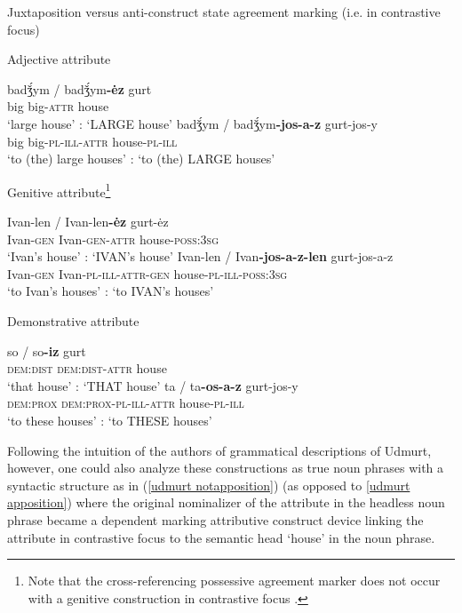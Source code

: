 \begin{exe}
\ex \rm{Juxtaposition versus anti-construct state agreement marking (i.e. in contrastive focus) \citep{kelmakov-etal1999,winkler2001}}
\begin{xlist}
\ex	\rm{Adjective attribute}
\begin{xlist}
\ex 	
\gll	badǯ́ym / badǯ́ym\textbf{-ėz} gurt\\
	big {} big-\textsc{attr} house\\
\glt	‘large house’ : ‘LARGE house’
\ex	
\gll	badǯ́ym / badǯ́ym\textbf{-jos-a-z} gurt-jos-y\\
	big {} big-\textsc{pl}-\textsc{ill}-\textsc{attr} house-\textsc{pl}-\textsc{ill}\\
\glt	‘to (the) large houses’ : ‘to (the) LARGE houses’
\end{xlist}
\ex	\rm{Genitive attribute}\footnote{Note that the cross-referencing possessive agreement marker does not occur with a genitive construction in contrastive focus \citep[81]{kelmakov-etal1999}.}
\begin{xlist}
\ex	
\gll	Ivan-len / Ivan-len\textbf{-ėz} gurt-ėz\\
	Ivan-\textsc{gen} {} Ivan-\textsc{gen}-\textsc{attr} house-\textsc{poss:3sg}\\
\glt	‘Ivan's house’ : ‘IVAN's house’
\ex	
\gll	Ivan-len / Ivan\textbf{-jos-a-z-len} gurt-jos-a-z\\
	Ivan-\textsc{gen} {} Ivan-\textsc{pl}-\textsc{ill}-\textsc{attr}-\textsc{gen} house-\textsc{pl}-\textsc{ill}-\textsc{poss:3sg}\\
\glt	‘to Ivan's houses’ : ‘to IVAN's houses’
\end{xlist}
\ex	\rm{Demonstrative attribute} \label{udmurt det dem}
\begin{xlist}
\ex	
\gll	so / so\textbf{-iz} gurt\\
 	\textsc{dem:dist} {} \textsc{dem:dist}-\textsc{attr} house\\
\glt	‘that house’ : ‘THAT house’
\ex 	
\gll	ta / ta\textbf{-os-a-z} gurt-jos-y\\
	\textsc{dem:prox} {} \textsc{dem:prox}-\textsc{pl}-\textsc{ill}-\textsc{attr} house-\textsc{pl}-\textsc{ill}\\
\glt	 ‘to these houses’ : ‘to THESE houses’
\end{xlist}
\end{xlist}
\end{exe}
Following the intuition of the authors of grammatical descriptions of Udmurt, however, one could also analyze these constructions as true noun phrases with a syntactic structure as in (\ref{udmurt notapposition}) (as opposed to \ref{udmurt apposition}) where the original nominalizer of the attribute in the headless noun phrase became a dependent marking attributive construct device linking the attribute in contrastive focus to the semantic head ‘house’ in the noun phrase.
